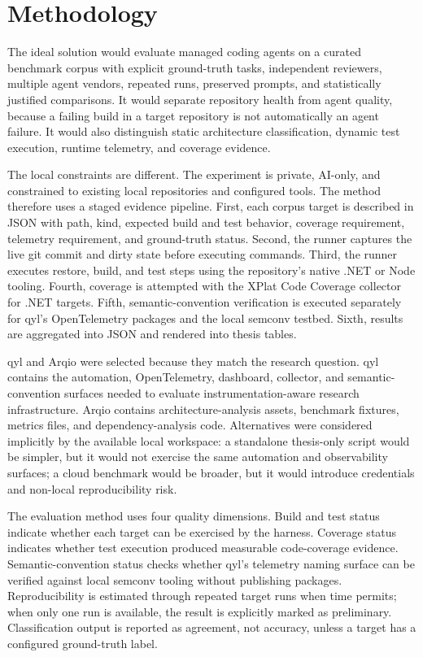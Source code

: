 \chapter{Methodology}

The ideal solution would evaluate managed coding agents on a curated benchmark corpus with explicit ground-truth tasks, independent reviewers, multiple agent vendors, repeated runs, preserved prompts, and statistically justified comparisons. It would separate repository health from agent quality, because a failing build in a target repository is not automatically an agent failure. It would also distinguish static architecture classification, dynamic test execution, runtime telemetry, and coverage evidence.

The local constraints are different. The experiment is private, AI-only, and constrained to existing local repositories and configured tools. The method therefore uses a staged evidence pipeline. First, each corpus target is described in JSON with path, kind, expected build and test behavior, coverage requirement, telemetry requirement, and ground-truth status. Second, the runner captures the live git commit and dirty state before executing commands. Third, the runner executes restore, build, and test steps using the repository's native .NET or Node tooling. Fourth, coverage is attempted with the XPlat Code Coverage collector for .NET targets. Fifth, semantic-convention verification is executed separately for qyl's OpenTelemetry packages and the local semconv testbed. Sixth, results are aggregated into JSON and rendered into thesis tables.

qyl and Arqio were selected because they match the research question. qyl contains the automation, OpenTelemetry, dashboard, collector, and semantic-convention surfaces needed to evaluate instrumentation-aware research infrastructure. Arqio contains architecture-analysis assets, benchmark fixtures, metrics files, and dependency-analysis code. Alternatives were considered implicitly by the available local workspace: a standalone thesis-only script would be simpler, but it would not exercise the same automation and observability surfaces; a cloud benchmark would be broader, but it would introduce credentials and non-local reproducibility risk.

The evaluation method uses four quality dimensions. Build and test status indicate whether each target can be exercised by the harness. Coverage status indicates whether test execution produced measurable code-coverage evidence. Semantic-convention status checks whether qyl's telemetry naming surface can be verified against local semconv tooling without publishing packages. Reproducibility is estimated through repeated target runs when time permits; when only one run is available, the result is explicitly marked as preliminary. Classification output is reported as agreement, not accuracy, unless a target has a configured ground-truth label.
